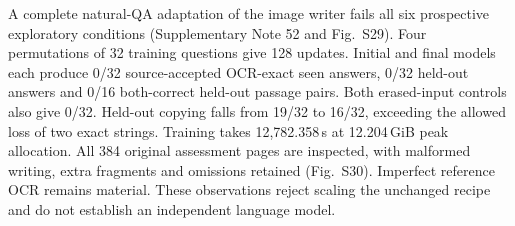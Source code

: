 A complete natural-QA adaptation of the image writer fails all six prospective
exploratory conditions (Supplementary Note 52 and Fig.~S29). Four permutations
of 32 training questions give 128 updates. Initial and final models each
produce 0/32 source-accepted OCR-exact seen answers, 0/32 held-out answers
and 0/16 both-correct held-out passage pairs. Both erased-input controls
also give 0/32. Held-out copying falls from 19/32 to 16/32, exceeding the
allowed loss of two exact strings. Training takes 12,782.358\,s at 12.204\,GiB
peak allocation. All 384 original assessment pages are inspected, with
malformed writing, extra fragments and omissions retained (Fig.~S30).
Imperfect reference OCR remains material. These observations reject scaling
the unchanged recipe and do not establish an independent language model.
